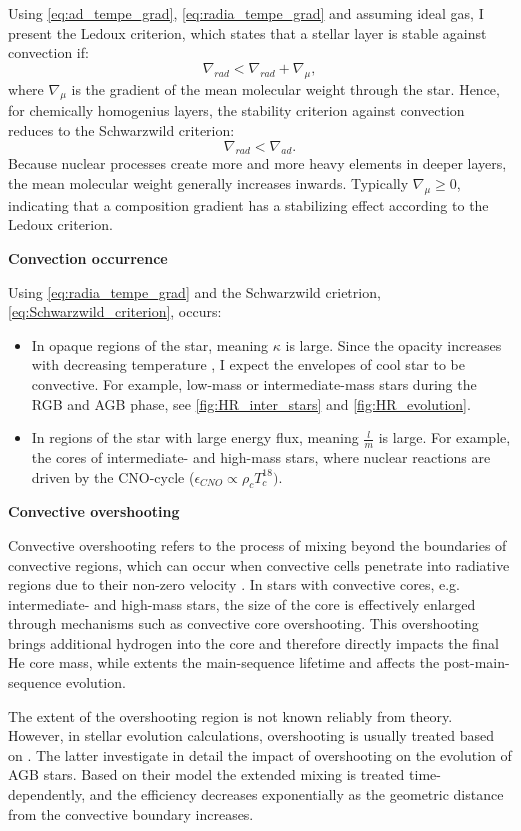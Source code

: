 Using \eqref{eq:ad_tempe_grad}, \eqref{eq:radia_tempe_grad}  and assuming ideal gas, I present the Ledoux criterion,  which states that a stellar layer is stable against convection if:
\begin{equation}\label{eq:Ledoux_criterion}
    \nabla_{rad} < \nabla_{rad} +  \nabla_{\mu},
\end{equation}
where $\nabla_{\mu}$ is the gradient of the mean molecular weight through the star. Hence, for chemically homogenius layers, the stability criterion against convection reduces to the Schwarzwild criterion:
\begin{equation}\label{eq:Schwarzwild_criterion}
    \nabla_{rad} < \nabla_{ad}.
\end{equation}
Because nuclear processes create more and more heavy elements in deeper layers, the mean molecular weight generally increases inwards. Typically $\nabla_{\mu} \geq 0$, indicating that a composition gradient has a stabilizing effect according to the Ledoux criterion. 

{\bf Convection occurrence}

Using \eqref{eq:radia_tempe_grad} and the Schwarzwild crietrion, \eqref{eq:Schwarzwild_criterion}, occurs:
\begin{itemize}
    \item In opaque regions of the star, meaning $\kappa$ is large. Since the opacity increases with decreasing temperature \citep{pols2011stellar}, I expect the envelopes of cool star to be convective. For example, low-mass or intermediate-mass stars during the RGB and AGB phase, see \cref{fig:HR_inter_stars} and \cref{fig:HR_evolution}.
    \item In regions of the star with large energy flux, meaning $\frac{l}{m}$ is large. For example, the cores of intermediate- and high-mass stars, where nuclear reactions are driven by the CNO-cycle ($\epsilon_{CNO} \propto \rho_c T_{c}^{18})$.
\end{itemize}

{\bf Convective overshooting}

Convective overshooting refers to the process of mixing beyond the boundaries of convective regions, which can occur when convective cells penetrate into radiative regions due to their non-zero velocity \citep{alongi1993evolutionary,brott2011rotating,schootemeijer2019constraining}. In stars with convective cores, e.g. intermediate- and high-mass stars, the size of the core is effectively enlarged through mechanisms such as convective core overshooting. This overshooting brings additional hydrogen into the core and therefore directly impacts the final He core mass, while extents the main-sequence lifetime and affects the post-main-sequence evolution.

The extent of the overshooting region is not known reliably from theory. However, in stellar evolution calculations, overshooting is usually treated based on \cite{herwig2000evolution}. The latter investigate in detail the impact of overshooting on the evolution of AGB stars. Based on their model the extended mixing is treated time-dependently, and the efficiency decreases exponentially as the geometric distance from the convective boundary increases. 

